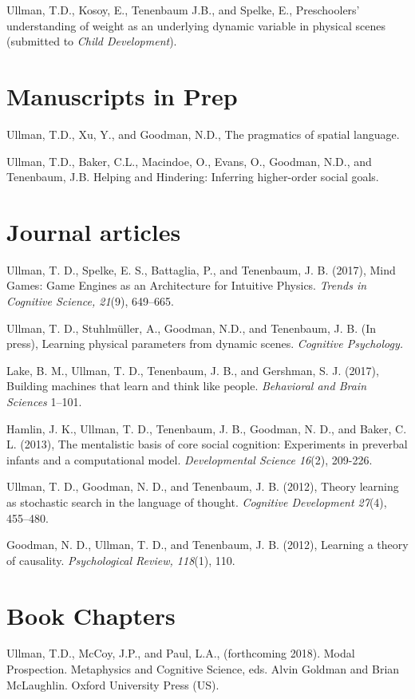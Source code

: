 \documentclass[margin,line,pifont,palatino,courier]{res}
\begin{document}
\begin{resume}
Ullman, T.D., Kosoy, E., Tenenbaum J.B., and Spelke, E., Preschoolers' understanding of weight as an underlying dynamic variable in physical scenes (submitted to \textit{Child Development}).

\section{\sc Manuscripts in Prep}
Ullman, T.D., Xu, Y., and Goodman, N.D., The pragmatics of spatial language. 

Ullman, T.D., Baker, C.L., Macindoe, O., Evans, O., Goodman, N.D., and Tenenbaum, J.B. Helping and Hindering: Inferring higher-order social goals. 

\section{\sc Journal articles}

Ullman, T. D., Spelke, E. S., Battaglia, P., and Tenenbaum, J. B. (2017), Mind Games: Game Engines as an Architecture for Intuitive Physics. \textit{Trends in Cognitive Science, 21}(9), 649--665.

Ullman, T. D., Stuhlm{\"u}ller, A., Goodman, N.D., and Tenenbaum, J. B. (In press), Learning physical parameters from dynamic scenes. \textit{Cognitive Psychology.}

Lake, B. M., Ullman, T. D., Tenenbaum, J. B., and Gershman, S. J. (2017), Building machines that learn and think like people. \textit{Behavioral and Brain Sciences} 1--101.

Hamlin, J. K., Ullman, T. D., Tenenbaum, J. B., Goodman, N. D., and Baker, C. L. (2013), The mentalistic basis of core social cognition: Experiments in preverbal infants and a computational model. \textit{Developmental Science 16}(2), 209-226.

Ullman, T. D., Goodman, N. D., and Tenenbaum, J. B. (2012), Theory learning as stochastic search in the language of thought. \textit{Cognitive Development 27}(4), 455--480.

Goodman, N. D., Ullman, T. D., and Tenenbaum, J. B. (2012), Learning a theory of causality. \textit{Psychological Review, 118}(1), 110. 

\section{\sc Book Chapters}

Ullman, T.D., McCoy, J.P., and Paul, L.A., (forthcoming 2018). Modal Prospection. Metaphysics and Cognitive Science, eds. Alvin Goldman and Brian McLaughlin. Oxford University Press (US).


\end{resume}
\end{document}

